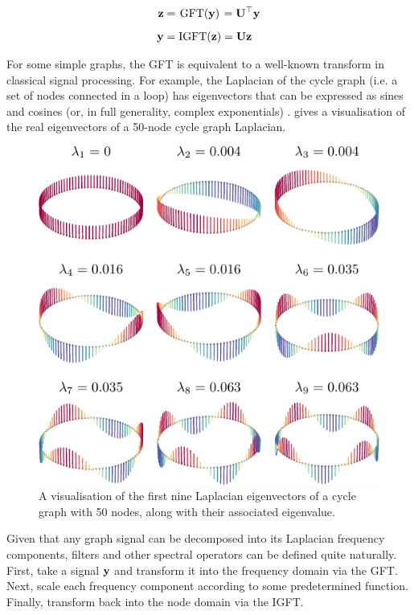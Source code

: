 \begin{align}
    \mathbf{z} &= \mkern 2mu \text{GFT}(\mathbf{y}) \mkern 2mu = \mathbf{U}^\top \mathbf{y} \\[0.2cm]
    \mathbf{y} &= \text{IGFT}(\mathbf{z})  = \mathbf{U} \mathbf{z}
\end{align}

For some simple graphs, the GFT is equivalent to a well-known transform in classical signal processing. For example, the Laplacian of the cycle graph (i.e. a set of nodes connected in a loop) has eigenvectors that can be expressed as sines and cosines (or, in full generality, complex exponentials) \citep{Puschel2003}.  gives a visualisation of the real eigenvectors of a 50-node cycle graph Laplacian. 

\begin{figure}[t]
	\centering
		\includegraphics[width=0.65\linewidth]{Figures/loop_plot.pdf}
        \caption[A visualisation of the real Laplacian eigenvectors of the cycle graph]{A visualisation of the first nine Laplacian eigenvectors of a cycle graph with 50 nodes, along with their associated eigenvalue.}
	\label{fig:cycle_eighs}
\end{figure}

Given that any graph signal can be decomposed into its Laplacian frequency components, filters and other spectral operators can be defined quite naturally. First, take a signal $\mathbf{y}$ and transform it into the frequency domain via the GFT. Next, scale each frequency component according to some predetermined function. Finally, transform back into the node domain via the IGFT. 


